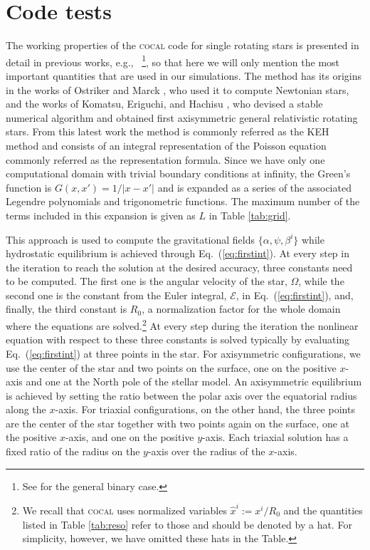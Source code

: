 \documentclass[twocolumn,superscriptaddress,showpacs,prd,aps,amsmath,amssymb,nofootinbib]{revtex4-1}
\newcommand{\cocal}{\textsc{cocal}}
\newcommand{\eg}{e.g.,~}
\begin{document}
\section{Code tests}
\label{sec:codetest}

The working properties of the \cocal{} code for single rotating stars is
presented in detail in previous works, \eg
\cite{Huang08,Uryu2016a}\footnote{See
  \cite{Uryu2012,Uryu:2012b,Tsokaros2012,Tsokaros2015} for the general
  binary case.}, so that here we will only mention the most important
quantities that are used in our simulations. The method has its origins
in the works of Ostriker and Marck \cite{Ostriker1968}, who used it to
compute Newtonian stars, and the works of Komatsu, Eriguchi, and Hachisu
\cite{Komatsu89}, who devised a stable numerical algorithm and obtained
first axisymmetric general relativistic rotating stars. From this latest
work the method is commonly referred as the KEH method
and consists of an integral representation of the Poisson equation
commonly referred as the representation formula. Since we have only one
computational domain with trivial boundary conditions at infinity, the
Green's function is $G(x,x')=1/|x-x'|$ and is expanded as a series of the
associated Legendre polynomials and trigonometric functions. The maximum
number of the terms included in this expansion is given as $L$ in Table
\ref{tab:grid}.

This approach is used to compute the gravitational fields
$\{\alpha,\psi,\beta^i\}$ while hydrostatic equilibrium is achieved
through Eq.~(\ref{eq:firstint}). At every step in the iteration to reach
the solution at the desired accuracy, three constants need to be
computed. The first one is the angular velocity of the star, $\Omega$,
while the second one is the constant from the Euler integral,
$\mathcal{E}$, in Eq.~(\ref{eq:firstint}), and, finally, the third
constant is $R_0$, a normalization factor for the whole domain where the
equations are solved.\footnote{We recall that \cocal{} uses normalized
  variables $\hat{x}^i:=x^i/R_0$ and the quantities listed in Table
  \ref{tab:reso} refer to those and should be denoted
  by a hat. For simplicity, however, we have omitted these hats in the
  Table.} At every step during the iteration the nonlinear equation with
respect to these three constants is solved typically by evaluating
Eq.~(\ref{eq:firstint}) at three points in the star. For axisymmetric
configurations, we use the center of the star and two points on the
surface, one on the positive $x$-axis and one at the North pole of the
stellar model. An axisymmetric equilibrium is achieved by setting the
ratio between the polar axis over the equatorial radius along the
$x$-axis. For triaxial configurations, on the other hand, the three
points are the center of the star together with two points again on the
surface, one at the positive $x$-axis, and one on the positive
$y$-axis. Each triaxial solution has a fixed ratio of the radius on the
$y$-axis over the radius of the $x$-axis.
\end{document}
